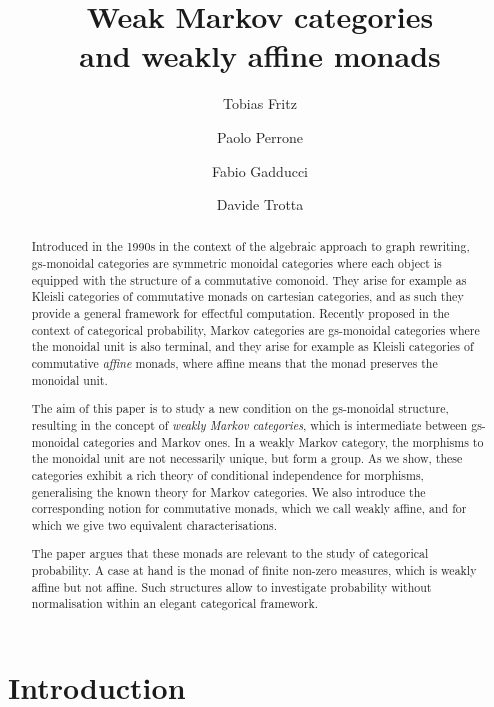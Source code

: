 \documentclass[a4paper,UKenglish,numberwithinsect,cleveref, autoref, thm-restate]{lipics-v2021}
\title{Weak Markov categories\\ and weakly affine monads}
\author{Tobias Fritz}{Department of Mathematics, University of Innsbruck, AT}{tobias.fritz@uibk.ac.at}{}{FWF P 35992-N}
\author{Paolo Perrone}{Department of Computer Science, University of Oxford, UK}{paolo.perrone@cs.ox.ac.uk}{https://orcid.org/0000-0002-9123-9089}{}
\author{Fabio Gadducci}{Department of Computer Science, University of Pisa, Pisa, IT}{fabio.gadducci@unipi.it}{https://orcid.org/
0000-0003-0690-3051}{MIUR PRIN 2017FTXR ``IT-MaTTerS''.}
\author{Davide Trotta}{Department of Computer Science, University of Pisa, Pisa, IT}{trottadavide92@gmail.com}{https://orcid.org/0000-0003-4509-594X}{MIUR PRIN 2017FTXR ``IT-MaTTerS''.}
\theoremstyle{plain} %
\theoremstyle{definition} %
\begin{document}
\maketitle

\begin{abstract}
   Introduced in the 1990s in the context of the algebraic approach to graph rewriting, 
   gs-monoidal categories are symmetric monoidal categories 
   where each object is equipped with the structure of a commutative comonoid. They arise for example as 
   Kleisli categories of commutative monads on cartesian categories, 
   and as such they provide a general framework for effectful computation. 
   Recently proposed in the context of categorical probability, Markov categories are
   gs-monoidal categories where the monoidal unit is also terminal, and they arise for example as
   Kleisli categories of commutative \emph{affine} monads, where affine means that the monad preserves the monoidal unit.

   The aim of this paper is to study a new condition on the gs-monoidal structure, resulting in the concept of \emph{weakly Markov categories},
   which is intermediate between gs-monoidal categories and Markov ones. 
   In a weakly Markov category, the morphisms to the monoidal unit are not necessarily unique, but form a group.
   As we show, these categories exhibit a rich theory of conditional independence for morphisms, generalising the known theory for Markov categories. 
   We also introduce the corresponding notion for commutative monads, which we call weakly affine, and for which we give two equivalent
   characterisations.

   The paper argues that these monads are relevant to the study of categorical probability.
   A case at hand is the monad of finite non-zero measures, which is weakly affine but not affine. 
   Such structures allow to investigate probability without normalisation within an elegant categorical framework.
\end{abstract}

\section{Introduction}
\end{document}
